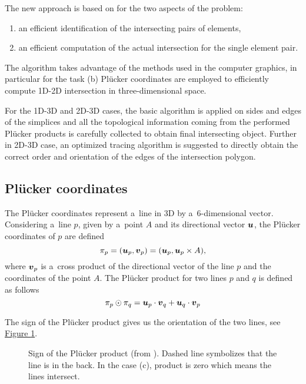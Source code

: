 \documentclass[FM,Dis]{tulthesis}
\newcommand{\fig}[1]{\hyperref[#1]{Figure \ref{#1}}}
\newcommand{\figpath}{figures/}
\begin{document}
The new approach is based on \cite{yuan_efficient_2003} for the two aspects of the problem: 
\begin{enumerate}[label=\alph*), itemsep=-3pt]
\item an efficient identification of the intersecting pairs of elements,
\item an efficient computation of the actual intersection for the single element pair.
\end{enumerate}
The algorithm takes advantage of the methods used in the computer graphics, in particular for the task (b) Pl\"{u}cker
coordinates are employed to efficiently compute 1D-2D intersection in three-dimensional space.

\begin{figure}[!htb]
  \centering
  \setcounter{subfigure}{0}
  \hspace{10pt}
\end{figure}
      
For the 1D-3D and 2D-3D cases, the basic algorithm is applied on sides and edges of the simplices and 
all the topological information coming from the performed Pl\"{u}cker products is carefully collected
to obtain final intersecting object.
Further in 2D-3D case, an optimized tracing algorithm is suggested to directly obtain the correct order and 
orientation of the edges of the intersection polygon.

\subsection{Pl\"{u}cker coordinates}
The Pl\"{u}cker coordinates represent a~line in 3D by a~6-dimensional vector.
Considering a~line $p$, given by a~point $A$ and its directional vector $\mathbf{\boldsymbol{u}}$, 
the Pl\"{u}cker coordinates of $p$ are defined
\[ \pi_p = (\mathbf{\boldsymbol{u}}_p, \mathbf{\boldsymbol{v}}_p) = (\mathbf{\boldsymbol{u}}_p, \mathbf{\boldsymbol{u}}_p\times A), \]
where $\mathbf{\boldsymbol{v}}_p$ is a~cross product of the directional vector of the line $p$ 
and the coordinates of the point $A$.
The Pl\"{u}cker product for two lines $p$ and $q$ is defined as follows 
\[\pi_p \odot \pi_q = \mathbf{\boldsymbol{u}}_p\cdot \mathbf{\boldsymbol{v}}_q + \mathbf{\boldsymbol{u}}_q \cdot \mathbf{\boldsymbol{v}}_p \]

The sign of the Pl\"{u}cker product gives us the orientation of the two lines, 
see \fig{fig:plucker_products}.

\begin{figure}[!htb]
  \begin{center}        
    \def\svgwidth{0.7\textwidth}
    
  \end{center}
  \caption{Sign of the Pl\"{u}cker product (from \cite{fris_dp_2015}). Dashed line symbolizes that the line 
           is in the back. In the case (c), product is zero which means the lines intersect.}
  \label{fig:plucker_products}
\end{figure}
\end{document}
